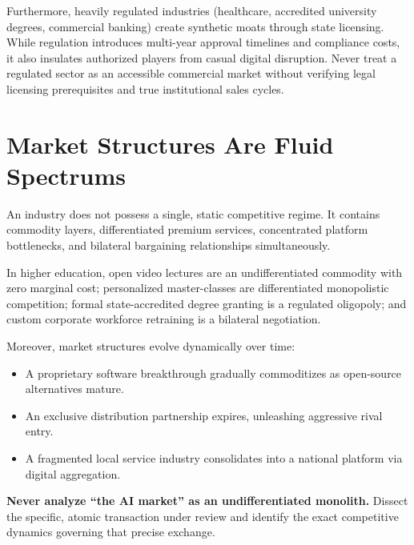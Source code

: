 Furthermore, heavily regulated industries (healthcare, accredited university degrees, commercial banking) create synthetic moats through state licensing. While regulation introduces multi-year approval timelines and compliance costs, it also insulates authorized players from casual digital disruption. Never treat a regulated sector as an accessible commercial market without verifying legal licensing prerequisites and true institutional sales cycles.

\section{Market Structures Are Fluid Spectrums}

An industry does not possess a single, static competitive regime. It contains commodity layers, differentiated premium services, concentrated platform bottlenecks, and bilateral bargaining relationships simultaneously.

In higher education, open video lectures are an undifferentiated commodity with zero marginal cost; personalized master-classes are differentiated monopolistic competition; formal state-accredited degree granting is a regulated oligopoly; and custom corporate workforce retraining is a bilateral negotiation.

Moreover, market structures evolve dynamically over time:
\begin{itemize}[leftmargin=12pt,itemsep=1pt,topsep=1pt]
  \item A proprietary software breakthrough gradually commoditizes as open-source alternatives mature.
  \item An exclusive distribution partnership expires, unleashing aggressive rival entry.
  \item A fragmented local service industry consolidates into a national platform via digital aggregation.
\end{itemize}

\textbf{Never analyze ``the AI market'' as an undifferentiated monolith.} Dissect the specific, atomic transaction under review and identify the exact competitive dynamics governing that precise exchange.
